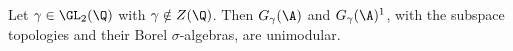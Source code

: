 Let $\gamma\in\GL_2(\Q)$ with $\gamma\notin Z(\Q)$. Then $G_\gamma(\A)$ and $G_\gamma(\A)^1$, with the subspace topologies and their Borel
$\sigma$-algebras, are unimodular.
